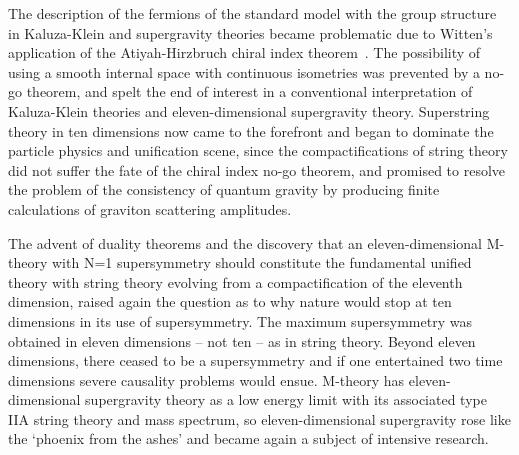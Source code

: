\documentclass[a4paper,12pt]{article}
\begin{document}
The description of the fermions of the standard model with
the group structure \coordHE{} in
Kaluza-Klein and supergravity theories became problematic due to
Witten's application of the Atiyah-Hirzbruch chiral index
theorem~\cite{Atiyah,Witten,Wetterich,Zwiebach,Moffat}. The
possibility of using a smooth internal space with continuous
isometries was prevented by a no-go theorem, and spelt the end
of interest in a conventional interpretation of Kaluza-Klein
theories and eleven-dimensional supergravity theory. Superstring
theory in ten dimensions now came to the forefront and began to
dominate the particle physics and unification scene, since the
compactifications of string theory did not suffer the fate of
the chiral index no-go theorem, and promised to resolve the
problem of the consistency of quantum gravity by producing
finite calculations of graviton scattering amplitudes.

The advent of
duality theorems and the discovery that an eleven-dimensional
M-theory with N=1 supersymmetry should constitute the fundamental
unified theory with string theory evolving from a
compactification of the eleventh dimension, raised again the
question as to why nature would stop at ten dimensions in its
use of supersymmetry. The maximum supersymmetry was obtained in
eleven dimensions -- not ten -- as in string theory. Beyond
eleven dimensions, there ceased to be a supersymmetry and if one
entertained two time dimensions severe causality problems
would ensue. M-theory has eleven-dimensional
supergravity theory as a low energy limit with its associated
type IIA string theory and mass spectrum, so eleven-dimensional
supergravity rose like the `phoenix from the ashes' and became
again a subject of intensive research.
\end{document}

